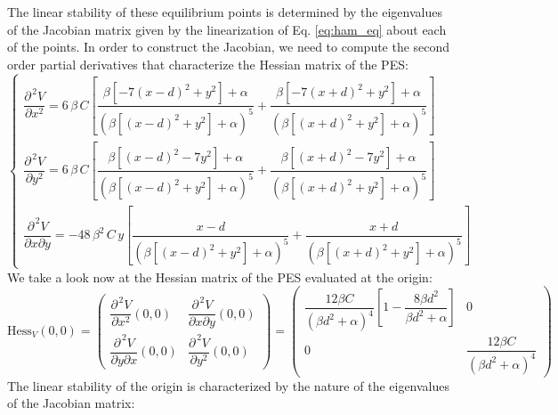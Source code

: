 \documentclass[10pt,aps,onecolumn,superscriptaddress]{revtex4-2}
\begin{document}
The linear stability of these equilibrium points is determined by the eigenvalues of the Jacobian matrix given by the linearization of Eq. \eqref{eq:ham_eq} about each of the points. In order to construct the Jacobian, we need to compute the second order partial derivatives that characterize the Hessian matrix of the PES:
\begin{equation}
\begin{cases}
\dfrac{\partial^{\,	2} V}{\partial x^2} = 6 \, \beta \, C \left[\dfrac{\beta\left[-7\left(x - d\right)^2 + y^2\right] + \alpha}{\left(\beta\left[\left(x - d\right)^2 + y^2\right] + \alpha\right)^5} + \dfrac{\beta\left[-7\left(x + d\right)^2 + y^2\right] + \alpha}{\left(\beta\left[\left(x + d\right)^2 + y^2\right] + \alpha\right)^5} \right] \\[.8cm]

\dfrac{\partial^{\,	2} V}{\partial y^2} = 6 \, \beta \, C \left[\dfrac{\beta\left[\left(x - d\right)^2 - 7 y^2\right] + \alpha}{\left(\beta\left[\left(x - d\right)^2 + y^2\right] + \alpha\right)^5} + \dfrac{\beta\left[\left(x + d\right)^2 - 7y^2\right] + \alpha}{\left(\beta\left[\left(x + d\right)^2 + y^2\right] + \alpha\right)^5} \right] \\[.8cm]

\dfrac{\partial^{\,	2} V}{\partial x \partial y} = - 48 \, \beta^2 \, C \, y \left[\dfrac{x - d}{\left(\beta\left[\left(x - d\right)^2 + y^2\right] + \alpha\right)^5} + \dfrac{x + d}{\left(\beta\left[\left(x + d\right)^2 + y^2\right] + \alpha\right)^5}\right]
\end{cases}
\label{eq:second_pder}
\end{equation}
We take a look now at the Hessian matrix of the PES evaluated at the origin:
\begin{equation}
\text{Hess}_{V}(0,0) = \begin{pmatrix}
\dfrac{\partial^{\,	2} V}{\partial x^2}(0,0) & \dfrac{\partial^{\,	2} V}{\partial x \partial y}(0,0) \\[.4cm]
\dfrac{\partial^{\,	2} V}{\partial y \partial x}(0,0) & \dfrac{\partial^{\, 2} V}{\partial y^2}(0,0)
\end{pmatrix} = \begin{pmatrix}
\dfrac{12 \beta C}{\left(\beta d^2 + \alpha\right)^4} \left[1 - \dfrac{8\beta d^2}{\beta d^2 + \alpha}\right] & 0 \\[.5cm]
0 & \dfrac{12 \beta C}{\left(\beta d^2 + \alpha\right)^4}
\end{pmatrix}
\end{equation}
The linear stability of the origin is characterized by the nature of the eigenvalues of the Jacobian matrix:
\end{document}

